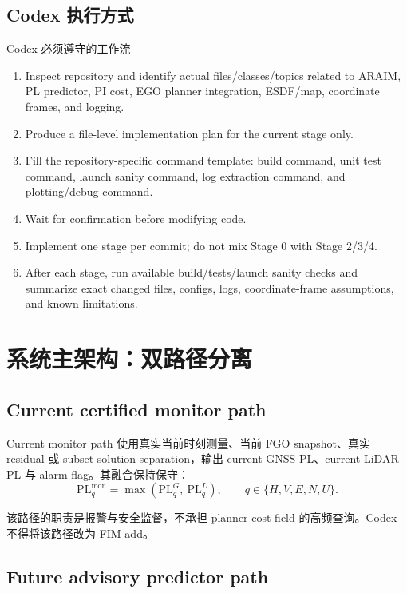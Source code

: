 \documentclass[11pt,a4paper]{article}
\newcommand{\PL}{\mathrm{PL}}
\newcommand{\mon}{\mathrm{mon}}
\begin{document}
\subsection{Codex 执行方式}

\begin{codexbox}{Codex 必须遵守的工作流}
  \begin{enumerate}
    \item Inspect repository and identify actual files/classes/topics related to ARAIM, PL predictor, PI cost, EGO planner integration, ESDF/map, coordinate frames, and logging.
    \item Produce a file-level implementation plan for the current stage only.
    \item Fill the repository-specific command template: build command, unit test command, launch sanity command, log extraction command, and plotting/debug command.
    \item Wait for confirmation before modifying code.
    \item Implement one stage per commit; do not mix Stage 0 with Stage 2/3/4.
    \item After each stage, run available build/tests/launch sanity checks and summarize exact changed files, configs, logs, coordinate-frame assumptions, and known limitations.
  \end{enumerate}
\end{codexbox}

\section{系统主架构：双路径分离}

\subsection{Current certified monitor path}

Current monitor path 使用真实当前时刻测量、当前 FGO snapshot、真实 residual 或 subset solution separation，输出 current GNSS PL、current LiDAR PL 与 alarm flag。其融合保持保守：
\[
  \boxed{
    \PL^{\mon}_q = \max\left(\PL^G_q,\ \PL^L_q\right),
    \qquad q\in\{H,V,E,N,U\}.
  }
\]

\noindent 该路径的职责是报警与安全监督，不承担 planner cost field 的高频查询。Codex 不得将该路径改为 FIM-add。

\subsection{Future advisory predictor path}
\end{document}
